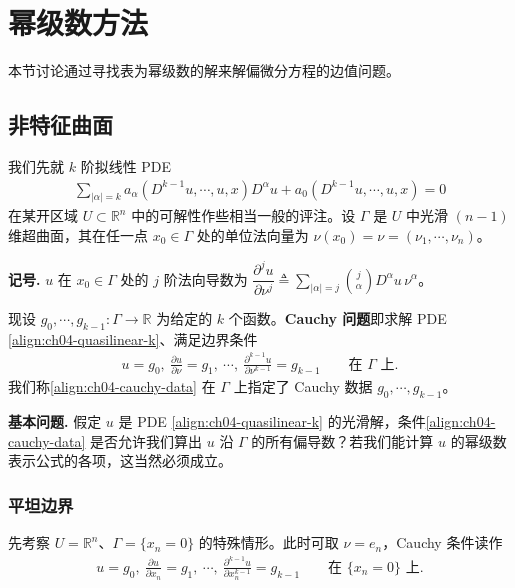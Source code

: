 \documentclass[../../main.tex]{subfiles}
\begin{document}
\section{幂级数方法}\label{section:ch04-powerseries}

本节讨论通过寻找表为幂级数的解来解偏微分方程的边值问题。

\subsection{非特征曲面}\label{subsection:ch04-noncharacteristic}

我们先就 $k$ 阶拟线性 PDE
\begin{align}\label{align:ch04-quasilinear-k}
\sum_{|\alpha|=k}a_\alpha(D^{k-1}u,\cdots,u,x)D^\alpha u+a_0(D^{k-1}u,\cdots,u,x)=0
\end{align}
在某开区域 $U\subset\mathbb{R}^n$ 中的可解性作些相当一般的评注。设 $\Gamma$ 是 $U$ 中光滑 $(n-1)$ 维超曲面，其在任一点 $x_0\in\Gamma$ 处的单位法向量为 $\nu(x_0)=\nu=(\nu_1,\cdots,\nu_n)$。

\textbf{记号.} $u$ 在 $x_0\in\Gamma$ 处的 $j$ 阶法向导数为 $\dfrac{\partial^j u}{\partial\nu^j}\triangleq\sum_{|\alpha|=j}\binom{j}{\alpha}D^\alpha u\,\nu^\alpha$。

现设 $g_0,\cdots,g_{k-1}:\Gamma\to\mathbb{R}$ 为给定的 $k$ 个函数。\textbf{Cauchy 问题}即求解 PDE \eqref{align:ch04-quasilinear-k}、满足边界条件
\begin{align}\label{align:ch04-cauchy-data}
u=g_0,\ \frac{\partial u}{\partial\nu}=g_1,\ \cdots,\ \frac{\partial^{k-1}u}{\partial\nu^{k-1}}=g_{k-1} \qquad\text{在 }\Gamma\text{ 上}.
\end{align}
我们称\eqref{align:ch04-cauchy-data} 在 $\Gamma$ 上指定了 Cauchy 数据 $g_0,\cdots,g_{k-1}$。

\textbf{基本问题.} 假定 $u$ 是 PDE \eqref{align:ch04-quasilinear-k} 的光滑解，条件\eqref{align:ch04-cauchy-data} 是否允许我们算出 $u$ 沿 $\Gamma$ 的所有偏导数？若我们能计算 $u$ 的幂级数表示公式的各项，这当然必须成立。

\subsubsection{平坦边界}

先考察 $U=\mathbb{R}^n$、$\Gamma=\{x_n=0\}$ 的特殊情形。此时可取 $\nu=e_n$，Cauchy 条件读作
\begin{align}\label{align:ch04-cauchy-flat}
u=g_0,\ \frac{\partial u}{\partial x_n}=g_1,\ \cdots,\ \frac{\partial^{k-1}u}{\partial x_n^{k-1}}=g_{k-1} \qquad\text{在 }\{x_n=0\}\text{ 上}.
\end{align}
\end{document}
